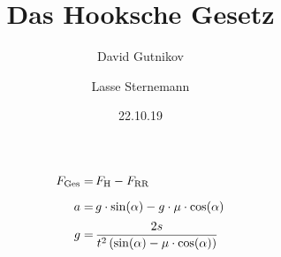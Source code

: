\documentclass[titlepage = firstcover]{scrartcl}
\title{Das Hooksche Gesetz}
\author{David Gutnikov \and Lasse Sternemann}
\date{22.10.19}
\begin{document}
    \maketitle

    \begin{align*}
        F_{\text{Ges}} =& \, F_{\text{H}} - F_{\text{RR}} \vspace{3cm} \\[6pt]
        a =& \, g \cdot \sin(\alpha) - g \cdot \mu \cdot \cos(\alpha)\\[2pt]
        g =& \, \frac{2s}{t^2\left(\sin(\alpha)- \mu \cdot \cos(\alpha)\right)}
    \end{align*}
\end{document}
